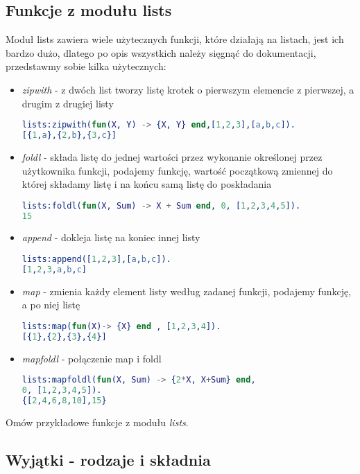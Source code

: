 \documentclass[a4paper,15pt]{article}
\newcommand{\ask}[2]{
    \begin{tcolorbox}[colback=black!5!white,colframe=gray,title={Pytanie #1}]
        #2
    \end{tcolorbox}
}
\begin{document}
\subsection{Funkcje z modułu lists}
Moduł lists zawiera wiele użytecznych funkcji, które działają na listach, jest ich bardzo dużo, dlatego po opis wszystkich należy sięgnąć do dokumentacji, przedstawmy sobie kilka użytecznych:
\begin{itemize}
\item \textit{zipwith} - z dwóch list tworzy listę krotek o pierwszym elemencie z pierwszej, a drugim z drugiej listy
\begin{lstlisting}[language=Erlang]
lists:zipwith(fun(X, Y) -> {X, Y} end,[1,2,3],[a,b,c]).
[{1,a},{2,b},{3,c}]
\end{lstlisting}
\item \textit{foldl} - składa listę do jednej wartości przez wykonanie określonej przez użytkownika funkcji, podajemy funkcję, wartość początkową zmiennej do której składamy listę i na końcu samą listę do poskładania
\begin{lstlisting}[language=Erlang]
lists:foldl(fun(X, Sum) -> X + Sum end, 0, [1,2,3,4,5]).
15
\end{lstlisting}
\item \textit{append} - dokleja listę na koniec innej listy
\begin{lstlisting}[language=Erlang]
lists:append([1,2,3],[a,b,c]).
[1,2,3,a,b,c]
\end{lstlisting}
\item \textit{map} - zmienia każdy element listy według zadanej funkcji, podajemy funkcję, a po niej listę
\begin{lstlisting}[language=Erlang]
lists:map(fun(X)-> {X} end , [1,2,3,4]).
[{1},{2},{3},{4}]
\end{lstlisting}
\item \textit{mapfoldl} - połączenie map i foldl
\begin{lstlisting}[language=Erlang]
lists:mapfoldl(fun(X, Sum) -> {2*X, X+Sum} end,
0, [1,2,3,4,5]).
{[2,4,6,8,10],15}
\end{lstlisting}
\end{itemize}


\ask{}{
Omów przykładowe funkcje z modułu \textit{lists}.
}

\subsection{Wyjątki - rodzaje i składnia}
\end{document}
